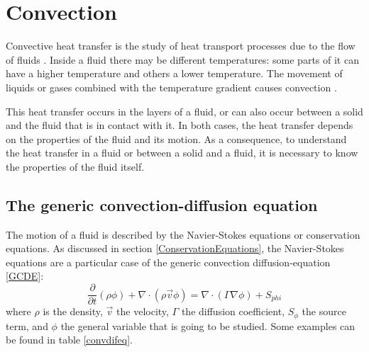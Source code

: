 \chapter{Convection}
Convective heat transfer is the study of heat transport processes due to the flow of fluids \cite{Bejan2013}. Inside a fluid there may be different temperatures: some parts of it can have a higher temperature and others a lower temperature. The movement of liquids or gases combined with the temperature gradient causes convection \cite{Bergman2011}.

This heat transfer occurs in the layers of a fluid, or can also occur between a solid and the fluid that is in contact with it. In both cases, the heat transfer depends on the properties of the fluid and its motion. As a consequence, to understand the heat transfer in a fluid or between a solid and a fluid, it is necessary to know the properties of the fluid itself.

\section{The generic convection-diffusion equation}
The motion of a fluid is described by the Navier-Stokes equations or conservation equations. As discussed in section \ref{ConservationEquations}, the Navier-Stokes equations are a particular case of the generic convection diffusion-equation \ref{GCDE}:
\begin{equation}
\frac{\partial}{\partial t}\left(\rho\phi\right)+\nabla\cdot\left(\rho\vec{v}\phi\right)=\nabla\cdot\left(\Gamma\nabla\phi\right)+S_{phi}
\label{GCDE}
\end{equation}
where $\rho$ is the density, $\vec{v}$ the velocity, $\Gamma$ the diffusion coefficient, $S_{\phi}$ the source term, and $\phi$ the general variable that is going to be studied. Some examples can be found in table \ref{convdifeq}.

